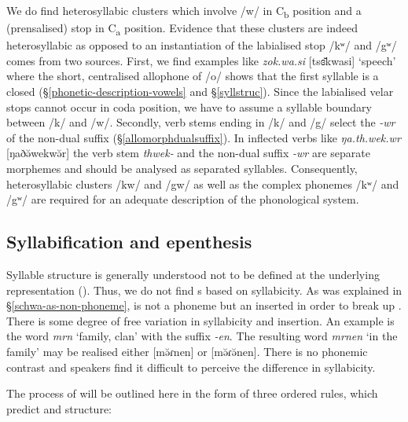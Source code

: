 \largerpage
We do find heterosyllabic clusters which involve /w/ in C\textsubscript{b} position and a  (prensalised) stop in  C\textsubscript{a} position. Evidence that these clusters are indeed heterosyllabic as opposed to an instantiation of the labialised  stop /kʷ/ and /{\ᵑ}gʷ/ comes from two sources. First, we find examples like \emph{zok.wa.si} [tsɞ̆kwasi] `speech' where the short, centralised allophone of /o/ shows that the first syllable is a closed  ({\S}\ref{phonetic-description-vowels} and {\S}\ref{syllstruc}). Since the labialised velar stops cannot occur in coda position, we have to assume a syllable boundary between /k/ and /w/. Secondly, verb stems ending in /k/ and /{\ᵑ}g/ select the \emph{-wr}  of the non-dual suffix ({\S}\ref{allomorphdualsuffix}). In inflected verbs like \emph{ŋa.th.wek.wr} [ŋaðə̆wekwə̆r] the verb stem \emph{thwek-} and the non-dual suffix \emph{-wr} are separate morphemes and should be analysed as separated syllables. Consequently, heterosyllabic clusters /kw/ and /{\ᵑ}gw/ as well as the complex phonemes /kʷ/ and /{\ᵑ}gʷ/ are required for an adequate description of the phonological system.

\subsection{Syllabification and epenthesis} \label{syllabificationandepenthesis}

Syllable structure is generally understood not to be defined at the underlying representation (\citealt[221]{Blevins:1995tt}). Thus, we do not find s based on syllabicity. As was explained in {\S}\ref{schwa-as-non-phoneme},  is not a phoneme but an  inserted in order to break up . There is some degree of free variation in syllabicity and  insertion. An example is the word \emph{mrn} `family, clan' with the  suffix \emph{-en}. The resulting word \emph{mrnen} `in the family' may be realised either [mə̆ɾnen] or [mə̆ɾə̆nen]. There is no phonemic contrast and speakers find it difficult to perceive the difference in syllabicity.

The process of  will be outlined here in the form of three ordered rules, which predict  and  structure:

